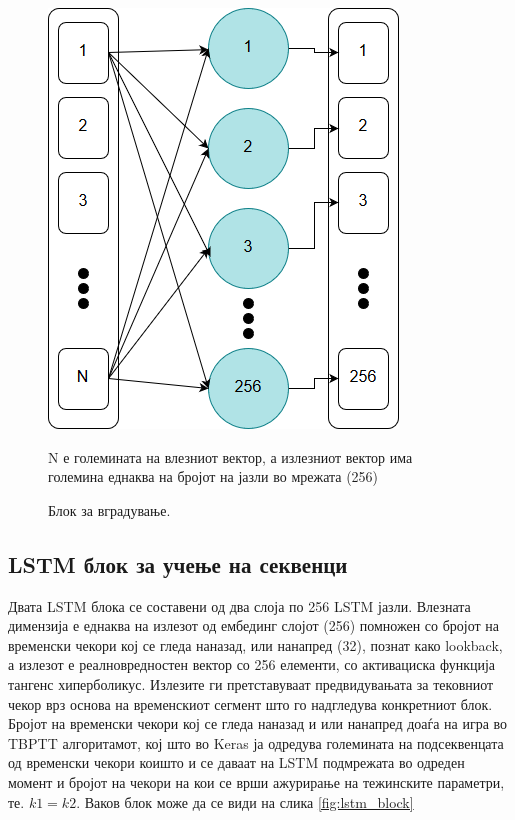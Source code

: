 \begin{figure}[H]
	\centering
    \includegraphics[scale=0.5]{images/embedding_block.png}
	\caption{Блок за вградување.}
	N е големината на влезниот вектор, а излезниот вектор има големина еднаква на бројот на јазли во мрежата (256)
	\label{fig:embedding}
\end{figure}

\subsection{LSTM блок за учење на секвенци}

Двата LSTM блока се составени од два слоја по 256 LSTM јазли. Влезната димензија е еднаква на излезот од ембединг слојот (256) помножен со бројот на временски чекори кој се гледа наназад, или нанапред (32), познат како lookback, а излезот е реалновредностен вектор со 256 елементи, со активациска функција тангенс хиперболикус. Излезите ги претставуваат предвидувањата за тековниот чекор врз основа на временскиот сегмент што го надгледува конкретниот блок. Бројот на временски чекори кој се гледа наназад и или нанапред доаѓа на игра во TBPTT алгоритамот, кој што во Keras ја одредува големината на подсеквенцата од временски чекори коишто и се даваат на LSTM подмрежата во одреден момент и бројот на чекори на кои се врши ажурирање на тежинските параметри, те. $k1=k2$. 
Ваков блок може да се види на слика \ref{fig:lstm_block}

